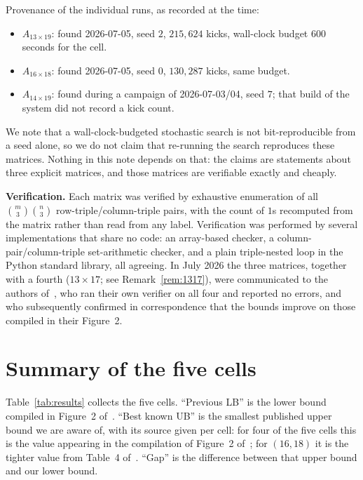 \documentclass[11pt,reqno]{amsart}
\theoremstyle{plain}
\theoremstyle{remark}
\begin{document}
Provenance of the individual runs, as recorded at the time:
\begin{itemize}
\item $A_{13\times19}$: found 2026-07-05, seed $2$, $215{,}624$ kicks, wall-clock budget
      $600$ seconds for the cell.
\item $A_{16\times18}$: found 2026-07-05, seed $0$, $130{,}287$ kicks, same budget.
\item $A_{14\times19}$: found during a campaign of 2026-07-03/04, seed $7$; that build of the system
      did not record a kick count.
\end{itemize}
We note that a wall-clock-budgeted stochastic search is not bit-reproducible from a seed
alone, so we do not claim that re-running the search reproduces these matrices. Nothing in this note
depends on that: the claims are statements about three explicit matrices, and those matrices are
verifiable exactly and cheaply.

\medskip
\noindent\textbf{Verification.} Each matrix was verified by exhaustive enumeration of all
$\binom{m}{3}\binom{n}{3}$ row-triple/column-triple pairs, with the count of $1$s recomputed from the
matrix rather than read from any label. Verification was performed by several implementations that
share no code: an array-based checker, a column-pair/column-triple set-arithmetic checker, and a
plain triple-nested loop in the Python standard library, all agreeing. In July 2026 the three
matrices, together with a fourth ($13\times17$; see Remark~\ref{rem:1317}), were communicated to the
authors of~\cite{BNL}, who ran their own verifier on all four and reported no errors, and who
subsequently confirmed in correspondence that the bounds improve on those compiled in their
Figure~2.

\section{Summary of the five cells}

Table~\ref{tab:results} collects the five cells. ``Previous LB'' is the lower bound compiled in
Figure~2 of~\cite{BNL}. ``Best known UB'' is the smallest published upper bound we are aware of, with
its source given per cell: for four of the five cells this is the value appearing in the compilation
of Figure~2 of~\cite{BNL}; for $(16,18)$ it is the tighter value from Table~4 of~\cite{CRWR16}.
``Gap'' is the difference between that upper bound and our lower bound.
\end{document}
